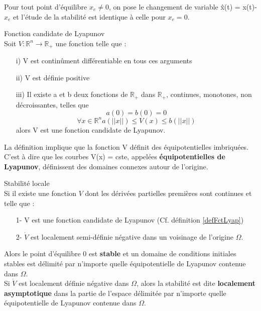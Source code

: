 Pour tout point d'équilibre $x_e \neq 0$, on pose le changement de variable \^{x}(t) = x(t)-$x_e$ et l'étude de la stabilité est identique à celle pour $x_e = 0$.
\begin{definition} Fonction candidate de Lyapunov\\
	\label{defFctLyap}
Soit $V : \mathbb{R}^n \rightarrow \mathbb{R}_+$ une fonction telle que : 
\begin{itemize}
\item[i)] V est continûment différentiable en tous ces arguments
\item[ii)] V est définie positive
\item[iii)] Il existe a et b deux fonctions de $\mathbb{R}_+$ dans $\mathbb{R}_+$, continues, monotones, non décroissantes, telles que
\[a(0) = b(0) = 0\]
\[\forall x \in \mathbb{R}^n a(||x||) \leq V(x) \leq b(||x||)\]
alors V est une fonction candidate de Lyapunov.
\end{itemize}
\end{definition}

\begin{rem}
La définition implique que la fonction V définit des équipotentielles imbriquées. C'est à dire que les courbes V(x) = cste, appelées \textbf{équipotentielles de Lyapunov}, définissent des domaines connexes autour de l'origine.
\end{rem}

\begin{theo} Stabilité locale\\
Si il existe une fonction $V$ dont les dérivées partielles premières sont continues et telle que :
\begin{itemize}
\item[1-] V est une fonction candidate de Lyapunov (Cf. définition \ref{defFctLyap})
\item[2-] $\dot{V}$ est localement semi-définie négative dans un voisinage de l'origine $\Omega$.
\end{itemize}

Alors le point d'équilibre 0 est \textbf{stable} et un domaine de conditions initiales stables est délimité par n'importe quelle équipotentielle de Lyapunov contenue dans $\Omega$.\\
Si $\dot{V}$ est localement définie négative dans $\Omega$, alors la stabilité est dite \textbf{localement asymptotique} dans la partie de l'espace délimitée par n'importe quelle équipotentielle de Lyapunov contenue dans $\Omega$.
\end{theo}

